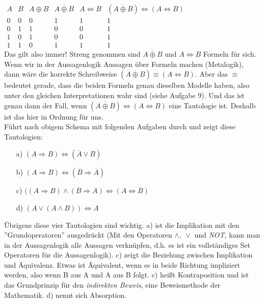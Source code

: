 \documentclass[12pt,a4paper,ngerman]{scrartcl}
\begin{document}
	$\begin{array}{cc|c|c|c|c}
		A & B & A \oplus B & \overline{A \oplus B} & A \Leftrightarrow B & (\overline{A \oplus B}) \Leftrightarrow (A \Leftrightarrow B)\\
		\hline
		0 & 0 & 0 & 1 & 1 & 1\\
		0 & 1 & 1 & 0 & 0 & 1\\
		1 & 0 & 1 & 0 & 0 & 1\\
		1 & 1 & 0 & 1 & 1 & 1
	\end{array}$\\
	Das gilt also immer! Streng genommen sind $\overline{A \oplus B}$ und $A \Leftrightarrow B$ Formeln für sich. Wenn wir in der Aussagenlogik Aussagen über Formeln machen (Metalogik), dann wäre die korrekte Schreibweise $(\overline{A \oplus B}) \equiv (A \Leftrightarrow B)$. Aber das $\equiv$ bedeutet gerade, dass die beiden Formeln genau dieselben Modelle haben, also unter den gleichen Interpretationen wahr sind (siehe Aufgabe 9). Und das ist genau dann der Fall, wenn $(\overline{A \oplus B}) \Leftrightarrow (A \Leftrightarrow B)$ eine Tautologie ist. Deshalb ist das hier in Ordnung für uns.\\
	Führt nach obigem Schema mit folgenden Aufgaben durch und zeigt diese Tautologien:
	\begin{itemize}
		\item[a)] $(A \Rightarrow B) \Leftrightarrow (\overline{A} \vee B)$
		\item[b)] $(A \Rightarrow B) \Leftrightarrow (\overline{B} \Rightarrow \overline{A})$
		\item[c)] $((A \Rightarrow B) \wedge (B \Rightarrow A) \Leftrightarrow (A \Leftrightarrow B)$
		\item[d)] $(A \vee (A \wedge B)) \Leftrightarrow A$
	\end{itemize}
	Übrigens diese vier Tautologien sind wichtig. a) ist die Implikation mit den ''Grundoperatoren'' ausgedrückt (Mit den Operatoren $\wedge,\ \vee$ und \emph{NOT}, kann man in der Aussagenlogik alle Aussagen verknüpfen, d.h. es ist ein vollständiges Set Operatoren für die Aussagenlogik). c) zeigt die Beziehung zwischen Implikation und Äquivalenz. Etwas ist Äquivalent, wenn es in beide Richtung impliziert werden, also wenn B aus A und A aus B folgt. c) heißt Kontraposition und ist das Grundprinzip für den \emph{indirekten Beweis}, eine Beweismethode der Mathematik. d) nennt sich Absorption.
	
\end{document}
